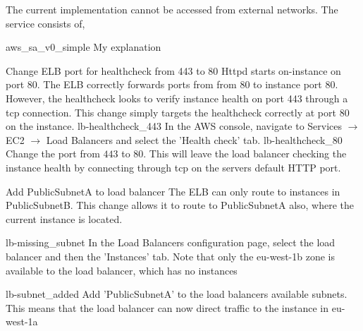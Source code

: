 \FloatBarrier


The current implementation cannot be accessed from external networks. The service consists of,


\imagefigsingle
{aws_sa_v0_simple}
{My explanation}

\FloatBarrier

{Change ELB port for healthcheck from 443 to 80}
{
	Httpd starts on-instance on port 80. The ELB correctly forwards ports
	from from 80 to instance port 80.  However, the healthcheck looks to verify instance health on port 443 through a tcp connection. This change simply targets the healthcheck correctly at port 80 on the instance.
}
{
	\imagefigsinglebox
	{lb-healthcheck_443}
	{In the AWS console, navigate to Services  $\rightarrow$ EC2  $\rightarrow$ Load Balancers and select the 'Health check' tab.}
	\imagefigsinglebox
	{lb-healthcheck_80}
	{Change the port from $443$ to $80$. This will leave the load balancer checking the instance health by connecting through tcp on the servers default HTTP port.}
}

\FloatBarrier


{Add PublicSubnetA to load balancer}
{
	The ELB can only route to instances in PublicSubnetB. This change
	allows it to route to PublicSubnetA also, where the current instance is located.
}
{
	\imagefigsinglebox
	{lb-missing_subnet}
	{In the Load Balancers configuration page, select the load balancer and then the 'Instances' tab. Note that only the eu-west-1b zone is available to the load balancer, which has no instances}
	
	\imagefigsinglebox
		{lb-subnet_added}
	{Add 'PublicSubnetA' to the load balancers available subnets. This means that the load balancer can now direct traffic to the instance in eu-west-1a}
}

